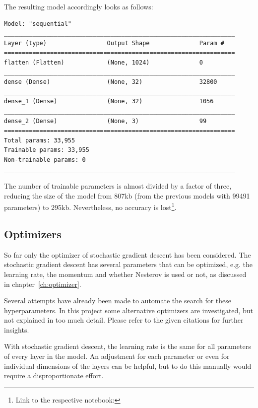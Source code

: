 The resulting model accordingly looks as follows:

\begin{lstlisting}
Model: "sequential"
_________________________________________________________________
Layer (type)                 Output Shape              Param #   
=================================================================
flatten (Flatten)            (None, 1024)              0         
_________________________________________________________________
dense (Dense)                (None, 32)                32800     
_________________________________________________________________
dense_1 (Dense)              (None, 32)                1056      
_________________________________________________________________
dense_2 (Dense)              (None, 3)                 99        
=================================================================
Total params: 33,955
Trainable params: 33,955
Non-trainable params: 0
_________________________________________________________________
\end{lstlisting}

The number of trainable parameters is almost divided by a factor of three, reducing the size of the model from 807kb (from the previous models with 99491 parameters) to 295kb.
Nevertheless, no accuracy is lost\footnote{Link to the respective notebook: }.

\subsection{Optimizers}

So far only the optimizer of stochastic gradient descent has been considered.
The stochastic gradient descent has several parameters that can be optimized, e.g. the learning rate, the momentum and whether Nesterov is used or not, as discussed in chapter~\ref{ch:optimizer}.

Several attempts have already been made to automate the search for these hyperparameters.
In this project some alternative optimizers are investigated, but not explained in too much detail.
Please refer to the given citations for further insights.

With stochastic gradient descent, the learning rate is the same for all parameters of every layer in the model.
An adjustment for each parameter or even for individual dimensions of the layers can be helpful, but to do this manually would require a disproportionate effort.

